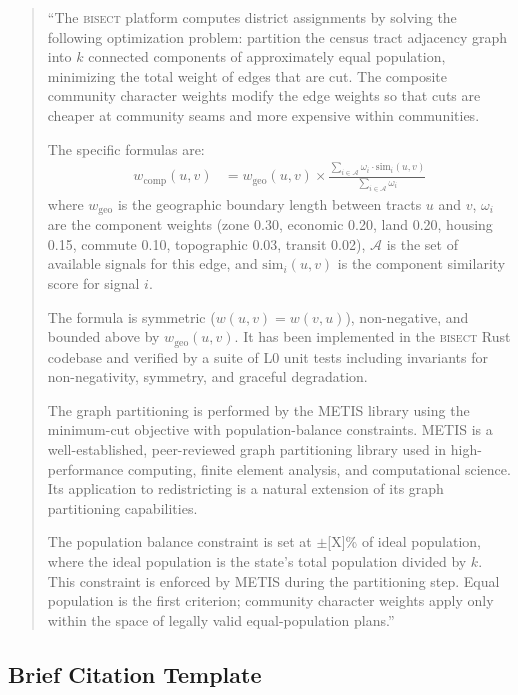 \begin{quote}
``The \textsc{bisect} platform computes district assignments by solving the
following optimization problem: partition the census tract adjacency graph
into $k$ connected components of approximately equal population, minimizing
the total weight of edges that are cut.
The composite community character weights modify the edge weights so that
cuts are cheaper at community seams and more expensive within communities.

The specific formulas are:
\begin{align*}
  w_{\mathrm{comp}}(u, v) &=
    w_{\mathrm{geo}}(u, v) \times
    \frac{\sum_{i \in \mathcal{A}} \omega_i \cdot \mathrm{sim}_i(u, v)}
         {\sum_{i \in \mathcal{A}} \omega_i}
\end{align*}
where $w_{\mathrm{geo}}$ is the geographic boundary length between tracts
$u$ and $v$, $\omega_i$ are the component weights (zone 0.30, economic 0.20,
land 0.20, housing 0.15, commute 0.10, topographic 0.03, transit 0.02),
$\mathcal{A}$ is the set of available signals for this edge, and
$\mathrm{sim}_i(u, v)$ is the component similarity score for signal $i$.

The formula is symmetric ($w(u,v) = w(v,u)$), non-negative, and bounded
above by $w_{\mathrm{geo}}(u, v)$.
It has been implemented in the \textsc{bisect} Rust codebase and verified
by a suite of L0 unit tests including invariants for non-negativity,
symmetry, and graceful degradation.

The graph partitioning is performed by the METIS library
\citep{karypis1998fast} using the minimum-cut objective with population-balance
constraints.
METIS is a well-established, peer-reviewed graph partitioning library used
in high-performance computing, finite element analysis, and computational
science.
Its application to redistricting is a natural extension of its graph
partitioning capabilities.

The population balance constraint is set at $\pm$[X]\% of ideal population,
where the ideal population is the state's total population divided by $k$.
This constraint is enforced by METIS during the partitioning step.
Equal population is the first criterion; community character weights apply
only within the space of legally valid equal-population plans.''
\end{quote}

\subsection{Brief Citation Template}

